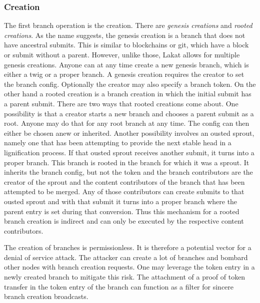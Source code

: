\subsubsection*{Creation} 
The first branch operation is the creation. There are \textit{genesis creations} and \textit{rooted creations}. As the name suggests, the genesis creation is a branch that does not have ancestral submits. This is similar to blockchains or git, which have a block or submit without a parent. However, unlike those, Lakat allows for multiple genesis creations. Anyone can at any time create a new genesis branch, which is either a twig or a proper branch. A genesis creation requires the creator to set the branch config. Optionally the creator may also specify a branch token. 
On the other hand a rooted creation is a branch creation in which the initial submit has a parent submit. There are two ways that rooted creations come about. One possibility is that a creator starts a new branch and chooses a parent submit as a root. Anyone may do that for any root branch at any time. The config can then either be chosen anew or inherited. Another possibility involves an ousted sprout, namely one that has been attempting to provide the next stable head in a lignification process. If that ousted sprout receives another submit, it turns into a proper branch. This branch is rooted in the branch for which it was a sprout. It inherits the branch config, but not the token and the branch contributors are the creator of the sprout and the content contributors of the branch that has been attempted to be merged. Any of those contributors can create submits to that ousted sprout and with that submit it turns into a proper branch where the parent entry is set during that conversion. Thus this mechanism for a rooted branch creation is indirect and can only be executed by the respective content contributors.

The creation of branches is permissionless. It is therefore a potential vector for a denial of service attack. The attacker can create a lot of branches and bombard other nodes with branch creation requests. One may leverage the token entry in a newly created branch to mitigate this risk. The attachment of a proof of token transfer in the token entry of the branch can function as a filter for sincere branch creation broadcasts.  

